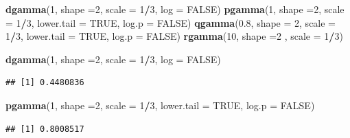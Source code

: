 \documentclass[]{book}
\newenvironment{Shaded}{\begin{snugshade}}{\end{snugshade}}
\newcommand{\DataTypeTok}[1]{\textcolor[rgb]{0.13,0.29,0.53}{#1}}
\newcommand{\DecValTok}[1]{\textcolor[rgb]{0.00,0.00,0.81}{#1}}
\newcommand{\FloatTok}[1]{\textcolor[rgb]{0.00,0.00,0.81}{#1}}
\newcommand{\KeywordTok}[1]{\textcolor[rgb]{0.13,0.29,0.53}{\textbf{#1}}}
\newcommand{\NormalTok}[1]{#1}
\newcommand{\OperatorTok}[1]{\textcolor[rgb]{0.81,0.36,0.00}{\textbf{#1}}}
\newcommand{\OtherTok}[1]{\textcolor[rgb]{0.56,0.35,0.01}{#1}}
\begin{document}
\begin{Shaded}
\begin{Highlighting}[]
\KeywordTok{dgamma}\NormalTok{(}\DecValTok{1}\NormalTok{, }\DataTypeTok{shape =}\DecValTok{2}\NormalTok{, }\DataTypeTok{scale =} \DecValTok{1}\OperatorTok{/}\DecValTok{3}\NormalTok{, }\DataTypeTok{log =} \OtherTok{FALSE}\NormalTok{)}
\KeywordTok{pgamma}\NormalTok{(}\DecValTok{1}\NormalTok{, }\DataTypeTok{shape =}\DecValTok{2}\NormalTok{, }\DataTypeTok{scale =} \DecValTok{1}\OperatorTok{/}\DecValTok{3}\NormalTok{, }\DataTypeTok{lower.tail =} \OtherTok{TRUE}\NormalTok{,}
       \DataTypeTok{log.p =} \OtherTok{FALSE}\NormalTok{)}
\KeywordTok{qgamma}\NormalTok{(}\FloatTok{0.8}\NormalTok{, }\DataTypeTok{shape =} \DecValTok{2}\NormalTok{,  }\DataTypeTok{scale =} \DecValTok{1}\OperatorTok{/}\DecValTok{3}\NormalTok{, }\DataTypeTok{lower.tail =} \OtherTok{TRUE}\NormalTok{,}
       \DataTypeTok{log.p =} \OtherTok{FALSE}\NormalTok{)}
\KeywordTok{rgamma}\NormalTok{(}\DecValTok{10}\NormalTok{, }\DataTypeTok{shape =}\DecValTok{2}\NormalTok{ , }\DataTypeTok{scale =} \DecValTok{1}\OperatorTok{/}\DecValTok{3}\NormalTok{)}
\end{Highlighting}
\end{Shaded}

\begin{Shaded}
\begin{Highlighting}[]
\KeywordTok{dgamma}\NormalTok{(}\DecValTok{1}\NormalTok{, }\DataTypeTok{shape =}\DecValTok{2}\NormalTok{, }\DataTypeTok{scale =} \DecValTok{1}\OperatorTok{/}\DecValTok{3}\NormalTok{, }\DataTypeTok{log =} \OtherTok{FALSE}\NormalTok{)}
\end{Highlighting}
\end{Shaded}

\begin{verbatim}
## [1] 0.4480836
\end{verbatim}

\begin{Shaded}
\begin{Highlighting}[]
\KeywordTok{pgamma}\NormalTok{(}\DecValTok{1}\NormalTok{, }\DataTypeTok{shape =}\DecValTok{2}\NormalTok{, }\DataTypeTok{scale =} \DecValTok{1}\OperatorTok{/}\DecValTok{3}\NormalTok{, }\DataTypeTok{lower.tail =} \OtherTok{TRUE}\NormalTok{,}
       \DataTypeTok{log.p =} \OtherTok{FALSE}\NormalTok{)}
\end{Highlighting}
\end{Shaded}

\begin{verbatim}
## [1] 0.8008517
\end{verbatim}
\end{document}

